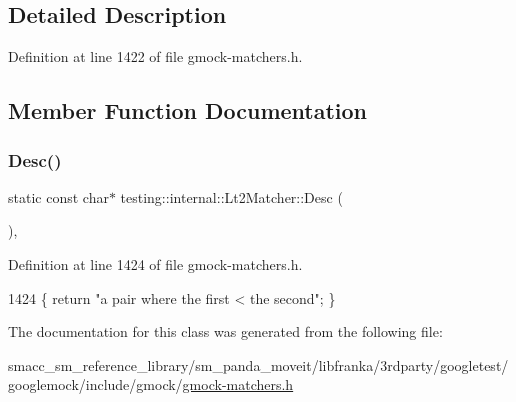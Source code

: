 \subsection{Detailed Description}


Definition at line 1422 of file gmock-\/matchers.\+h.



\subsection{Member Function Documentation}
\mbox{\label{classtesting_1_1internal_1_1Lt2Matcher_ae5d3129050392105e21755f39b933b09}} 
\subsubsection{\texorpdfstring{Desc()}{Desc()}}
{\footnotesize\ttfamily static const char$\ast$ testing\+::internal\+::\+Lt2\+Matcher\+::\+Desc (\begin{DoxyParamCaption}{ }\end{DoxyParamCaption})\hspace{0.3cm}{\ttfamily [inline]}, {\ttfamily [static]}}



Definition at line 1424 of file gmock-\/matchers.\+h.


\begin{DoxyCode}
1424 \{ \textcolor{keywordflow}{return} \textcolor{stringliteral}{"a pair where the first < the second"}; \}
\end{DoxyCode}


The documentation for this class was generated from the following file\+:\begin{DoxyCompactItemize}
\item 
smacc\+\_\+sm\+\_\+reference\+\_\+library/sm\+\_\+panda\+\_\+moveit/libfranka/3rdparty/googletest/googlemock/include/gmock/\hyperlink{gmock-matchers_8h}{gmock-\/matchers.\+h}\end{DoxyCompactItemize}
